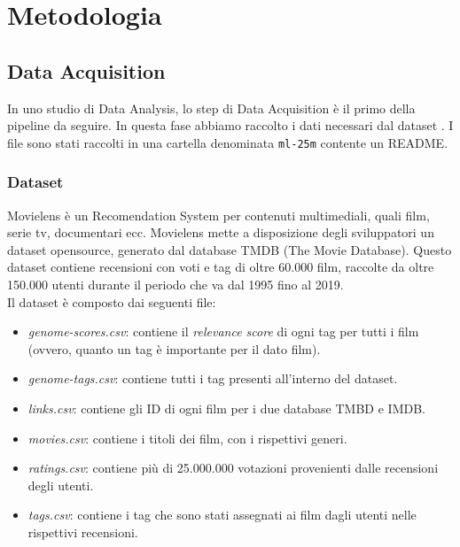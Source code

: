\documentclass[../../Report.tex]{subfiles}
\begin{document}
\chapter{Metodologia}

\section{Data Acquisition}
In uno studio di Data Analysis, lo step di Data Acquisition è il primo della pipeline da seguire.
In questa fase abbiamo raccolto i dati necessari dal dataset \cite{movielens}.
I file sono stati raccolti in una cartella denominata \texttt{ml-25m} contente un README.


\subsection*{Dataset}
\label{dataset}

Movielens è un Recomendation System per contenuti multimediali, quali film, serie tv, documentari ecc.
Movielens mette a disposizione degli sviluppatori un dataset opensource, generato dal database TMDB (The Movie Database)\cite{tmdb}.
Questo dataset contiene recensioni con voti e tag di oltre 60.000 film, raccolte da oltre 150.000 utenti durante il periodo che va dal 1995 fino al 2019.
\\
Il dataset è composto dai seguenti file:
\begin{itemize}
    \item \textit{genome-scores.csv}: contiene il \textit{relevance score} di ogni tag per tutti i film (ovvero, quanto un tag è importante per il dato film).
    \item \textit{genome-tags.csv}: contiene tutti i tag presenti all'interno del dataset.
    \item \textit{links.csv}: contiene gli ID di ogni film per i due database TMBD e IMDB\cite{imdb}.
    \item \textit{movies.csv}: contiene i titoli dei film, con i rispettivi generi.
    \item \textit{ratings.csv}: contiene più di 25.000.000 votazioni provenienti dalle recensioni degli utenti.
    \item \textit{tags.csv}: contiene i tag che sono stati assegnati ai film dagli utenti nelle rispettivi recensioni.
\end{itemize}
\end{document}

